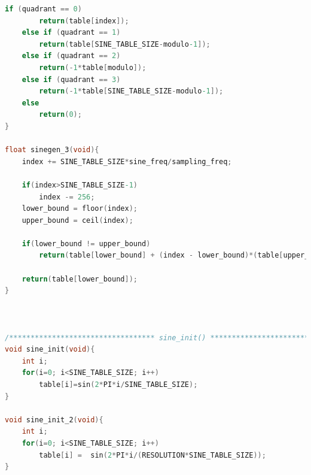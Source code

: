 \documentclass{article}
\begin{document}
\begin{lstlisting}[language=C, caption=Full Code Listing]
	if (quadrant == 0)
		return(table[index]);
	else if (quadrant == 1)
		return(table[SINE_TABLE_SIZE-modulo-1]);
	else if (quadrant == 2)
		return(-1*table[modulo]);
	else if (quadrant == 3)
		return(-1*table[SINE_TABLE_SIZE-modulo-1]);	
	else
		return(0);
}

float sinegen_3(void){
	index += SINE_TABLE_SIZE*sine_freq/sampling_freq;

	if(index>SINE_TABLE_SIZE-1)
		index -= 256;
	lower_bound = floor(index);
	upper_bound = ceil(index);
	
	if(lower_bound != upper_bound)
    	return(table[lower_bound] + (index - lower_bound)*(table[upper_bound]-table[lower_bound])/(upper_bound-lower_bound)); 
 
    return(table[lower_bound]); 
}



/********************************** sine_init() ***************************************/   
void sine_init(void){
	int i;
	for(i=0; i<SINE_TABLE_SIZE; i++)
		table[i]=sin(2*PI*i/SINE_TABLE_SIZE);
}

void sine_init_2(void){
	int i;
	for(i=0; i<SINE_TABLE_SIZE; i++)
		table[i] =  sin(2*PI*i/(RESOLUTION*SINE_TABLE_SIZE));
}

\end{lstlisting}
\end{document}
